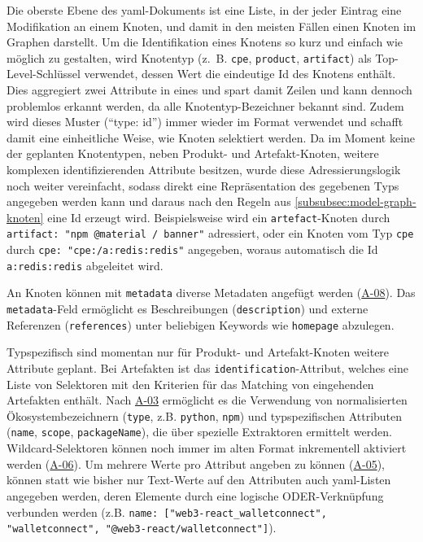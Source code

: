 Die oberste Ebene des \acrshort{yaml}-Dokuments ist eine Liste, in der jeder Eintrag eine Modifikation an einem Knoten, und damit in den meisten Fällen einen Knoten im Graphen darstellt.
Um die Identifikation eines Knotens so kurz und einfach wie möglich zu gestalten, wird Knotentyp (z.\ B. \texttt{cpe}, \texttt{product}, \texttt{artifact}) als Top-Level-Schlüssel verwendet, dessen Wert die eindeutige Id des Knotens enthält.
Dies aggregiert zwei Attribute in eines und spart damit Zeilen und kann dennoch problemlos erkannt werden, da alle Knotentyp-Bezeichner bekannt sind.
Zudem wird dieses Muster (\enquote{type: id}) immer wieder im Format verwendet und schafft damit eine einheitliche Weise, wie Knoten selektiert werden.
Da im Moment keine der geplanten Knotentypen, neben Produkt- und Artefakt-Knoten, weitere komplexen identifizierenden Attribute besitzen, wurde diese Adressierungslogik noch weiter vereinfacht, sodass direkt eine Repräsentation des gegebenen Typs angegeben werden kann und daraus nach den Regeln aus \autoref{subsubsec:model-graph-knoten} eine Id erzeugt wird.
Beispielsweise wird ein \texttt{artefact}-Knoten durch \texttt{artifact: "npm @material / banner"} adressiert, oder ein Knoten vom Typ \texttt{cpe} durch \texttt{cpe: "cpe:/a:redis:redis"} angegeben, woraus automatisch die Id \texttt{a:redis:redis} abgeleitet wird.

An Knoten können mit \texttt{metadata} diverse Metadaten angefügt werden (\hyperref[subsec:req-reason-format]{A-08}).
Das \texttt{metadata}-Feld ermöglicht es Beschreibungen (\texttt{description}) und externe Referenzen (\texttt{references}) unter beliebigen Keywords wie \texttt{homepage} abzulegen.

Typspezifisch sind momentan nur für Produkt- und Artefakt-Knoten weitere Attribute geplant.
Bei Artefakten ist das \texttt{identification}-Attribut, welches eine Liste von Selektoren mit den Kriterien für das Matching von eingehenden Artefakten enthält.
Nach \hyperref[subsec:req-type-specific-matching]{A-03} ermöglicht es die Verwendung von normalisierten Ökosystembezeichnern (\texttt{type}, z.B. \texttt{python}, \texttt{npm}) und typspezifischen Attributen (\texttt{name}, \texttt{scope}, \texttt{packageName}), die über spezielle Extraktoren ermittelt werden.
Wildcard-Selektoren können noch immer im alten Format inkrementell aktiviert werden (\hyperref[subsec:req-regex-support]{A-06}).
Um mehrere Werte pro Attribut angeben zu können (\hyperref[subsec:req-multiple-attribute-values]{A-05}), können statt wie bisher nur Text-Werte auf den Attributen auch \acrshort{yaml}-Listen angegeben werden, deren Elemente durch eine logische ODER-Verknüpfung verbunden werden (z.B. \texttt{name: ["web3-react\_walletconnect", "walletconnect", "@web3-react/walletconnect"]}).


